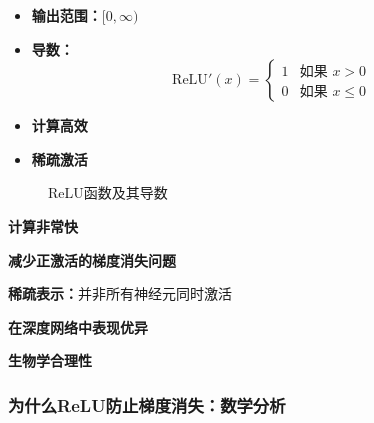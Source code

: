 \begin{properties}[ReLU的性质]
\begin{itemize}
    \item \textbf{输出范围：}$[0, \infty)$
    \item \textbf{导数：} 
    \begin{equation}
    \text{ReLU}'(x) = 
    \begin{cases}
    1 & \text{如果 } x > 0 \\
    0 & \text{如果 } x \leq 0
    \end{cases}
    \end{equation}
    \item \textbf{计算高效}
    \item \textbf{稀疏激活}
\end{itemize}
\end{properties}

\begin{figure}[htbp]
    \centering
    \caption[ReLU函数及其导数]{ReLU函数及其导数}
    \label{fig:relu}
\end{figure}

\begin{advantages}
    \item \textbf{计算非常快}
    \item \textbf{减少正激活的梯度消失问题}
    \item \textbf{稀疏表示：}并非所有神经元同时激活
    \item \textbf{在深度网络中表现优异}
    \item \textbf{生物学合理性}
\end{advantages}

\subsubsection{为什么ReLU防止梯度消失：数学分析}


